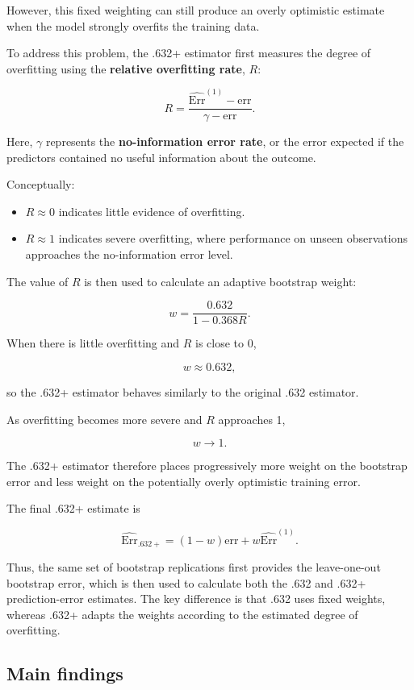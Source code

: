 \documentclass[
  letterpaper,
  DIV=11,
  numbers=noendperiod]{scrreprt}
\providecommand{\tightlist}{%
  \setlength{\itemsep}{0pt}\setlength{\parskip}{0pt}}
\begin{document}
However, this fixed weighting can still produce an overly optimistic
estimate when the model strongly overfits the training data.

To address this problem, the .632+ estimator first measures the degree
of overfitting using the \textbf{relative overfitting rate}, \(R\):

\[
R
=
\frac{
\widehat{\mathrm{Err}}^{(1)}-\mathrm{err}
}{
\gamma-\mathrm{err}
}.
\]

Here, \(\gamma\) represents the \textbf{no-information error rate}, or
the error expected if the predictors contained no useful information
about the outcome.

Conceptually:

\begin{itemize}
\tightlist
\item
  \(R\approx0\) indicates little evidence of overfitting.
\item
  \(R\approx1\) indicates severe overfitting, where performance on
  unseen observations approaches the no-information error level.
\end{itemize}

The value of \(R\) is then used to calculate an adaptive bootstrap
weight:

\[
w
=
\frac{0.632}{1-0.368R}.
\]

When there is little overfitting and \(R\) is close to 0,

\[
w\approx0.632,
\]

so the .632+ estimator behaves similarly to the original .632 estimator.

As overfitting becomes more severe and \(R\) approaches 1,

\[
w\rightarrow1.
\]

The .632+ estimator therefore places progressively more weight on the
bootstrap error and less weight on the potentially overly optimistic
training error.

The final .632+ estimate is

\[
\widehat{\mathrm{Err}}_{.632+}
=
(1-w)\mathrm{err}
+
w\widehat{\mathrm{Err}}^{(1)}.
\]

Thus, the same set of bootstrap replications first provides the
leave-one-out bootstrap error, which is then used to calculate both the
.632 and .632+ prediction-error estimates. The key difference is that
.632 uses fixed weights, whereas .632+ adapts the weights according to
the estimated degree of overfitting.

\subsection{Main findings}\label{main-findings-1}
\end{document}
